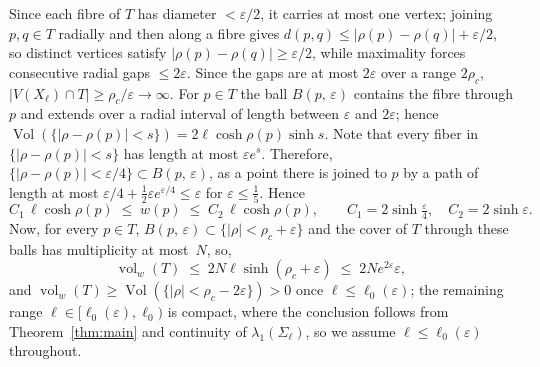 \documentclass[10pt,reqno]{amsart}
\theoremstyle{remark}
\newcommand{\Vol}{\operatorname{Vol}}
\newcommand{\vol}{\operatorname{vol}}
\newcommand{\B}[2]{B(#1,\,#2)}
\begin{document}
Since each fibre of $T$ has diameter $<\varepsilon/2$, it carries at
most one vertex; joining $p,q\in T$ radially and then along a fibre
gives $d(p,q)\le|\rho(p)-\rho(q)|+\varepsilon/2$, so distinct vertices
satisfy $|\rho(p)-\rho(q)|\ge\varepsilon/2$, while maximality forces
consecutive radial gaps $\le2\varepsilon$. Since the gaps are at most $2\varepsilon$ over a range
$2\rho_c$, $|V(X_\ell)\cap T|\ge\rho_c/\varepsilon\to\infty$. For $p\in T$ the
ball $\B{p}{\varepsilon}$ contains the fibre through $p$ and extends
over a radial interval of length between $\varepsilon$ and
$2\varepsilon$; hence
$\Vol(\{|\rho-\rho(p)|<s\})=2\ell\cosh\rho(p)\sinh s$. Note that every fiber in
$\{|\rho-\rho(p)|<s\}$ has length at most $\varepsilon e^s$. Therefore, $\{|\rho-\rho(p)|<\varepsilon/4\}\subset \B{p}{\varepsilon}$, as a point there is joined to $p$ by a
path of length at most $\varepsilon/4+\tfrac12\varepsilon e^{\varepsilon/4}
\le\varepsilon$ for $\varepsilon\le\tfrac15$. Hence
\begin{equation}
\label{eq:collar-weight}
  C_1\,\ell\cosh\rho(p)\;\le\;w(p)\;\le\;C_2\,\ell\cosh\rho(p),
  \qquad
  C_1=2\sinh\tfrac\varepsilon4,\quad C_2=2\sinh\varepsilon.
\end{equation}
Now, for every $p\in T$, $\B{p}{\varepsilon}\subset\{|\rho|<\rho_c+\varepsilon\}$ and the cover of $T$ through these balls has multiplicity at most~$N$, so,
\begin{equation}
\label{eq:volT}
  \vol_w(T)\;\le\;2N\ell\sinh(\rho_c+\varepsilon)\;\le\;
  2Ne^{2\varepsilon}\varepsilon ,
\end{equation}
and $\vol_w(T)\ge\Vol(\{|\rho|<\rho_c-2\varepsilon\})>0$ once
$\ell\le\ell_0(\varepsilon)$; the
remaining range $\ell\in[\ell_0(\varepsilon),\ell_0)$ is compact, where
the conclusion follows from Theorem~\ref{thm:main} and continuity of
$\lambda_1(\Sigma_\ell)$, so we assume $\ell\le\ell_0(\varepsilon)$
throughout.
\end{document}
